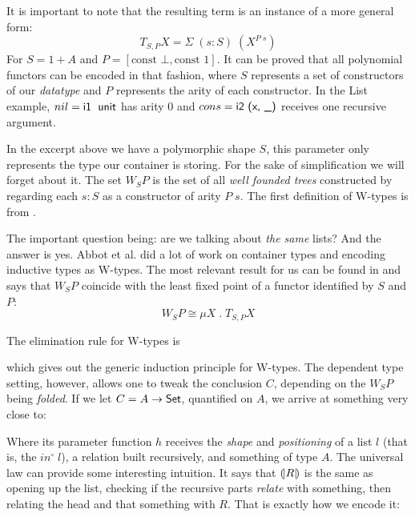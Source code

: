 It is important to note that the resulting term is an instance of a more general form: 
\[ T_{S, P} X = \Sigma\; (s : S)\; (X^{P\; s})\] 
For $S = 1 + A$ and $P = [ \text{const }\bot , \text{const }1 ]$. It can be proved
that all polynomial functors can be encoded in that fashion\cite{Abbott04}, where $S$ represents
a set of constructors of our \emph{datatype} and $P$ represents the arity of each constructor.
In the List example, $nil = \IC{i1\; unit}$ has arity 0 and $cons = \IC{i2 (x, \_)}$ receives
one recursive argument.


In the excerpt above we have a polymorphic shape $S$, this parameter
only represents the type our container is storing. For the sake of simplification we will forget about it.
The set $W_S P$ is the set of all \emph{well founded trees} constructed by regarding each $s : S$ 
as a constructor of arity $P\; s$. The first definition of W-types is from \cite{lof84}.


The important question being: are we talking about \emph{the same} lists? And the answer 
is yes. Abbot et al. did a lot of work on container types
and encoding inductive types as W-types. The most relevant result for us can be found in \cite{Abbott04} and
says that $W_S P$ coincide with the least fixed point of a functor identified by $S$ and $P$:
\[
  W_S P \cong \mu X\; . \;T_{S , P} X
\]

The elimination rule for W-types is


which gives out the generic induction principle for W-types. The dependent type setting, however, allows
one to tweak the conclusion $C$, depending on the $W_S P$ being \emph{folded}. If we let
$C = A \rightarrow \D{Set}$, quantified on $A$, we arrive at something very close to:


Where its parameter function $h$ receives the \emph{shape} and \emph{positioning} of a list $l$
(that is, the $in^\circ\;l$), a relation built recursively, and something of type $A$.
The universal law can provide some interesting intuition. It says that $\mathopen{(\!|}R\mathclose{|\!)}$ is
the same as opening up the list, checking if the recursive parts \emph{relate} with something,
then relating the head and that something with $R$. That is exactly how we encode it:


